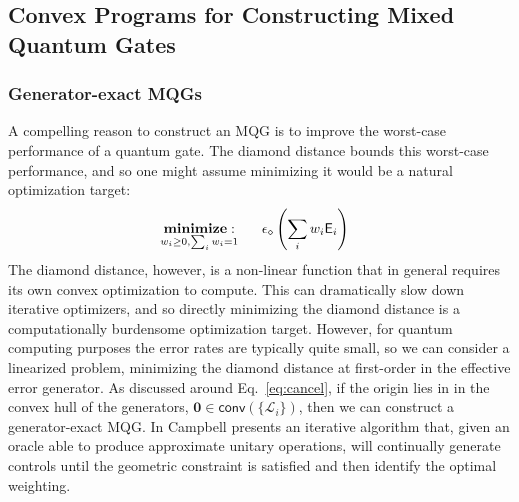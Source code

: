 \documentclass[aps,nofootinbib,pra,notitlepage,twocolumn]{revtex4-1}
\newcommand{\error}{\ensuremath{{\mathsf{E}}}}
\newcommand{\genmat}{\ensuremath{{\mathcal{L}}}}
\newcommand{\dnorm}{\ensuremath{\epsilon_\diamond}}
\newcommand{\0}{\ensuremath{\mathbf{0}}}
\newcommand{\weight}{\ensuremath{w}}
\begin{document}
\subsection{Convex Programs for Constructing Mixed Quantum Gates}
\subsubsection{Generator-exact MQGs} %
\label{sub:first_order_generators}
\noindent A compelling reason to construct an MQG is to improve the worst-case performance of a quantum gate. The diamond distance bounds this worst-case performance, and so one might assume minimizing it would be a natural optimization target:
\begin{equation}\label{eq:ddmin}
  \begin{split}
    &\underset{\weight_i\geq0, \sum_i\weight_i=1}{\textbf{minimize}: } \hspace{.5cm} \dnorm\left(\sum_i\weight_i\error_i \right)
  \end{split}
\end{equation}
The diamond distance, however, is a non-linear function that in general requires its own convex optimization to compute\cite{watrous2018theory}. This can dramatically slow down iterative optimizers, and so directly minimizing the diamond distance is a computationally burdensome optimization target. However, for quantum computing purposes the error rates are typically quite small, so we can consider a linearized problem, minimizing the diamond distance at first-order in the effective error generator. As discussed around Eq.~\eqref{eq:cancel}, if the origin lies in in the convex hull of the generators, $\0 \in \mathsf{conv}(\{\genmat_i\})$, then we can construct a generator-exact MQG. In \cite{Campbell2017} Campbell presents an iterative algorithm that, given an oracle able to produce approximate unitary operations, will continually generate controls until the geometric constraint is satisfied and then identify the optimal weighting. 
\end{document}
